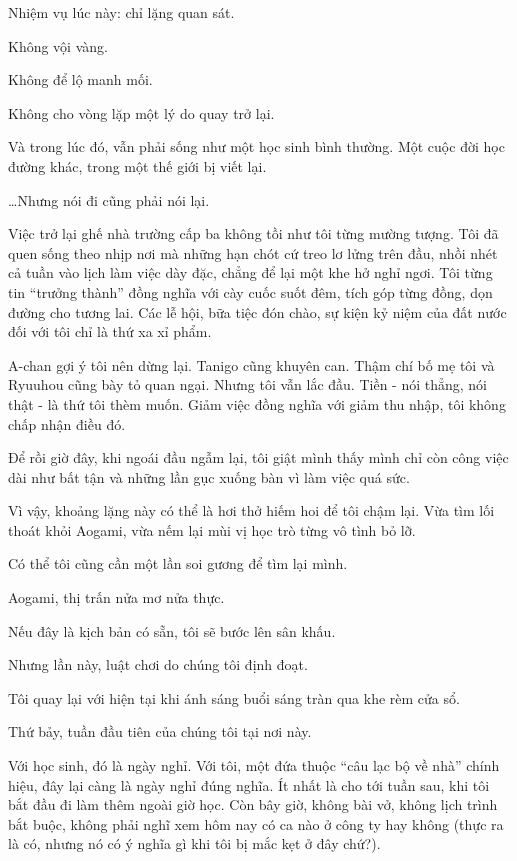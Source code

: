 \documentclass[../main.tex]{subfiles}
\begin{document}
Nhiệm vụ lúc này: chỉ lặng quan sát.

Không vội vàng.

Không để lộ manh mối.

Không cho vòng lặp một lý do quay trở lại.

Và trong lúc đó, vẫn phải sống như một học sinh bình thường. Một cuộc đời học đường khác, trong một thế giới bị viết lại.

\dots Nhưng nói đi cũng phải nói lại.

Việc trở lại ghế nhà trường cấp ba không tồi như tôi từng mường tượng. Tôi đã quen sống theo nhịp nơi mà những hạn chót cứ treo lơ lửng trên đầu, nhồi nhét cả tuần vào lịch làm việc dày đặc, chẳng để lại một khe hở nghỉ ngơi. Tôi từng tin ``trưởng thành'' đồng nghĩa với cày cuốc suốt đêm, tích góp từng đồng, dọn đường cho tương lai. Các lễ hội, bữa tiệc đón chào, sự kiện kỷ niệm của đất nước đối với tôi chỉ là thứ xa xỉ phẩm.

A-chan gợi ý tôi nên dừng lại. Tanigo cũng khuyên can. Thậm chí bố mẹ tôi và Ryuuhou cũng bày tỏ quan ngại.  Nhưng tôi vẫn lắc đầu. Tiền - nói thẳng, nói thật - là thứ tôi thèm muốn. Giảm việc đồng nghĩa với giảm thu nhập, tôi không chấp nhận điều đó.

Để rồi giờ đây, khi ngoái đầu ngẫm lại, tôi giật mình thấy mình chỉ còn công việc dài như bất tận và những lần gục xuống bàn vì làm việc quá sức.

Vì vậy, khoảng lặng này có thể là hơi thở hiếm hoi để tôi chậm lại. Vừa tìm lối thoát khỏi Aogami, vừa nếm lại mùi vị học trò từng vô tình bỏ lỡ.

Có thể tôi cũng cần một lần soi gương để tìm lại mình.

Aogami, thị trấn nửa mơ nửa thực.

Nếu đây là kịch bản có sẵn, tôi sẽ bước lên sân khấu.

Nhưng lần này, luật chơi do chúng tôi định đoạt.

\ct

Tôi quay lại với hiện tại khi ánh sáng buổi sáng tràn qua khe rèm cửa sổ.

Thứ bảy, tuần đầu tiên của chúng tôi tại nơi này.

Với học sinh, đó là ngày nghỉ. Với tôi, một đứa thuộc ``câu lạc bộ về nhà'' chính hiệu, đây lại càng là ngày nghỉ đúng nghĩa. Ít nhất là cho tới tuần sau, khi tôi bắt đầu đi làm thêm ngoài giờ học. Còn bây giờ, không bài vở, không lịch trình bắt buộc, không phải nghĩ xem hôm nay có ca nào ở công ty hay không (thực ra là có, nhưng nó có ý nghĩa gì khi tôi bị mắc kẹt ở đây chứ?).
\end{document}

